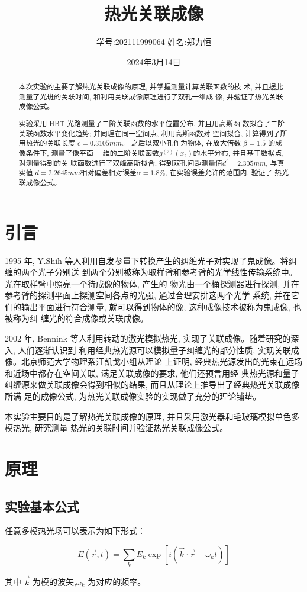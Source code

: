 \documentclass[12pt,a4paper]{article}
\title{\vspace{-4cm}\Large 热光关联成像}  %
\author{\kaishu 学号:202111999064 \hspace{2cm} 姓名:郑力恒}   %
\date{2024年3月14日}
\newcommand{\be}[1]{
    \begin{equation}
        #1
    \end{equation}
}
\begin{document}
\maketitle

\begin{abstract}
    本次实验的主要了解热光关联成像的原理, 并掌握测量计算关联函数的技
术, 并且据此测量了光斑的关联时间, 和利用关联成像原理进行了双孔一维成
像, 并验证了热光关联成像公式。

实验采用 HBT 光路测量了二阶关联函数的水平位置分布, 并且用高斯函
数拟合了二阶关联函数水平变化趋势; 并同理在同一空间点, 利用高斯函数对
空间拟合, 计算得到了所用热光的关联长度 $c = 0.3105 mm$。
之后以双小孔作为物体, 在放大倍数 $\beta = 1.5$ 的成像条件下, 测量了像平面
一维的二阶关联函数$ g^{(2)}(x_2) $的水平分布, 并且基于数据点, 对测量得到的关
联函数进行了双峰高斯拟合, 得到双孔间距测量值$ d^{\prime} = 2.305mm$, 与真实值
$d = 2.2645mm $相对偏差相对误差$ \alpha = 1.8\%$, 
在实验误差允许的范围内, 验证了
热光联成像公式。
\end{abstract}

\section{引言}
1995 年, Y.Shih 等人利用自发参量下转换产生的纠缠光子对实现了鬼成像。将纠缠的两个光子分别送
到两个分别被称为取样臂和参考臂的光学线性传输系统中。光在取样臂中照亮一个待成像的物体, 产生的
物光由一个桶探测器进行探测, 并在参考臂的探测平面上探测空间各点的光强, 通过合理安排这两个光学
系统, 并在它们的输出平面进行符合测量, 就可以得到物体的像, 这种成像技术被称为鬼成像, 也被称为纠
缠光的符合成像或关联成像。

2002 年, Bennink 等人利用转动的激光模拟热光, 实现了关联成像。随着研究的深入, 人们逐渐认识到
利用经典热光源可以模拟量子纠缠光的部分性质, 实现关联成像。北京师范大学物理系汪凯戈小组从理论
上证明, 经典热光源发出的光束在远场和近场中都存在空间关联, 满足关联成像的要求, 他们还预言用经
典热光源和量子纠缠源来做关联成像会得到相似的结果, 而且从理论上推导出了经典热光关联成像所满
足的成像公式, 为热光关联成像实验的实现做了充分的理论铺垫。

本实验主要目的是了解热光关联成像的原理, 并且采用激光器和毛玻璃模拟单色多模热光, 研究测量
热光的关联时间并验证热光关联成像公式。


\section{原理}
\subsection{实验基本公式}
任意多模热光场可以表示为如下形式：
\be{E(\vec{r}, t)=\sum_{k} E_{k} \exp \left[i\left(\vec{k} \cdot \vec{r}-\omega_{k} t\right)\right]}
其中 $\vec k$ 为模的波矢,$\omega_k$ 为对应的频率。
\end{document}
